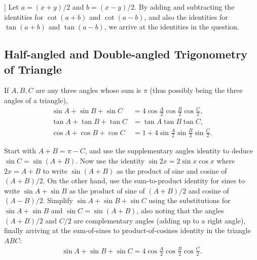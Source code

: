 \begin{solution}[name=Proof of Tangent and Cotangent Sum-to-Product]]
Let $a=(x+y)/2$ and $b=(x-y)/2$. By adding and subtracting the identities for $\cot(a+b)$ and $\cot(a-b)$, and also the identities for $\tan(a+b)$ and $\tan(a-b)$, we arrive at the identities in the question.
\end{solution}


\subsection{Half-angled and Double-angled Trigonometry of Triangle}

    \begin{question}\label{q:sinA+sinB+sinC}
        If $A, B, C$ are any three angles whose sum is $\pi$ (thus possibly being the three angles of a triangle),
        \begin{align}
            \sin A + \sin B + \sin C &= 4 \cos \frac{A}{2} \cos \frac{B}{2} \cos \frac{C}{2},\\
            \tan A + \tan B + \tan C &= \tan A \tan B \tan C,\\
            \cos A + \cos B + \cos C &= 1 + 4 \sin \frac{A}{2} \sin \frac{B}{2} \sin \frac{C}{2}.
        \end{align}
    \end{question}

\begin{solution}
    Start with $A + B = \pi - C$, and use the supplementary angles identity to deduce $\sin C = \sin(A+B)$. Now use the identity $\sin 2x = 2\sin x \cos x$ where $2x=A+B$ to write $\sin(A+B)$ as the product of sine and cosine of $(A+B)/2$. On the other hand, use the sum-to-product identity for sines to write $\sin A + \sin B$ as the product of sine of $(A+B)/2$ and cosine of $(A-B)/2$. Simplify $\sin A + \sin B + \sin C$ using the substitutions for $\sin A + \sin B$ and $\sin C = \sin (A+B)$, also noting that the angles $(A+B)/2$ and $C/2$ are complementary angles (adding up to a right angle), finally arriving at the sum-of-sines to product-of-cosines identity in the triangle $ABC$:
    \begin{align*}
            \sin A + \sin B + \sin C = 4 \cos \frac{A}{2} \cos \frac{B}{2} \cos \frac{C}{2}.
    \end{align*}
\end{solution}

